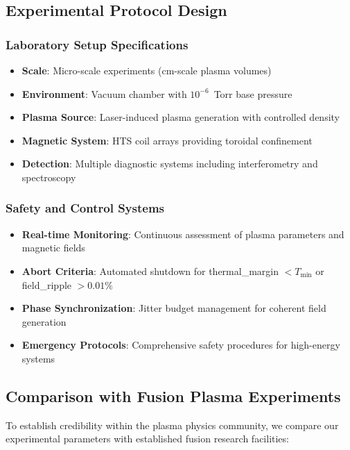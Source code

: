 \documentclass[12pt,a4paper]{article}
\begin{document}
\subsection{Experimental Protocol Design}

\subsubsection{Laboratory Setup Specifications}
\begin{itemize}
\item \textbf{Scale}: Micro-scale experiments (cm-scale plasma volumes)
\item \textbf{Environment}: Vacuum chamber with $10^{-6}$~Torr base pressure
\item \textbf{Plasma Source}: Laser-induced plasma generation with controlled density
\item \textbf{Magnetic System}: HTS coil arrays providing toroidal confinement
\item \textbf{Detection}: Multiple diagnostic systems including interferometry and spectroscopy
\end{itemize}

\subsubsection{Safety and Control Systems}
\begin{itemize}
\item \textbf{Real-time Monitoring}: Continuous assessment of plasma parameters and magnetic fields
\item \textbf{Abort Criteria}: Automated shutdown for thermal\_margin $< T_{\min}$ or field\_ripple $> 0.01\%$
\item \textbf{Phase Synchronization}: Jitter budget management for coherent field generation
\item \textbf{Emergency Protocols}: Comprehensive safety procedures for high-energy systems
\end{itemize}

\subsection{Comparison with Fusion Plasma Experiments}

To establish credibility within the plasma physics community, we compare our experimental parameters with established fusion research facilities:
\end{document}
